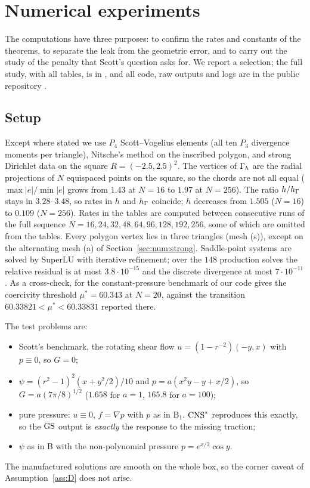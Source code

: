 \section{Numerical experiments}\label{sec:numerics}

The computations have three purposes: to confirm the rates and constants of the theorems, to separate the leak from the geometric error, and to carry out the study of the penalty that Scott's question asks for. We report a selection; the full study, with all tables, is in \cite{PadhiExt}, and all code, raw outputs and logs are in the public repository \cite{ZeroGradRepo}.

\subsection{Setup}
Except where stated we use $P_4$ Scott--Vogelius elements (all ten $P_3$ divergence moments per triangle), Nitsche's method on the inscribed polygon, and strong Dirichlet data on the square $R=(-2.5,2.5)^2$. The vertices of $\Gamma_h$ are the radial projections of $N$ equispaced points on the square, so the chords are not all equal ($\max|e|/\min|e|$ grows from $1.43$ at $N=16$ to $1.97$ at $N=256$). The ratio $h/h_\Gamma$ stays in $3.28$--$3.48$, so rates in $h$ and $h_\Gamma$ coincide; $h$ decreases from $1.505$ ($N=16$) to $0.109$ ($N=256$). Rates in the tables are computed between consecutive runs of the full sequence $N=16,24,32,48,64,96,128,192,256$, some of which are omitted from the tables. Every polygon vertex lies in three triangles (mesh (s)), except on the alternating mesh (a) of Section~\ref{sec:num:strong}. Saddle-point systems are solved by SuperLU \cite{SuperLU} with iterative refinement; over the $148$ production solves the relative residual is at most $3.8\cdot10^{-15}$ and the discrete divergence at most $7\cdot10^{-11}$. As a cross-check, for the constant-pressure benchmark of \cite{Cavalcante} our code gives the coercivity threshold $\mu^\ast=60.343$ at $N=20$, against the transition $60.33821<\mu^\ast<60.33831$ reported there.

The test problems are:
\begin{itemize}
\item[\textbf{A}] Scott's benchmark, the rotating shear flow $u=(1-r^{-2})(-y,x)$ with $p\equiv0$, so $G=0$;
\item[\textbf{B$_a$}] $\psi=(r^2-1)^2(x+y^2/2)/10$ and $p=a(x^2y-y+x/2)$, so $G=a(7\pi/8)^{1/2}$ ($1.658$ for $a=1$, $165.8$ for $a=100$);
\item[\textbf{P}] pure pressure: $u\equiv0$, $f=\nabla p$ with $p$ as in B$_1$. $\mathrm{CNS}^\ast$ reproduces this exactly, so the $\mathrm{GS}$ output is \emph{exactly} the response to the missing traction;
\item[\textbf{C}] $\psi$ as in B with the non-polynomial pressure $p=e^{x/2}\cos y$.
\end{itemize}
The manufactured solutions are smooth on the whole box, so the corner caveat of Assumption~\ref{ass:D} does not arise.

